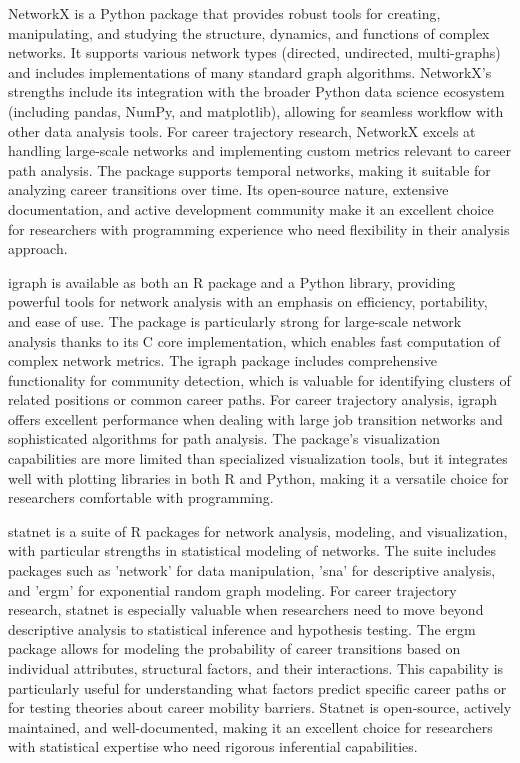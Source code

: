 \documentclass[../main.tex]{subfiles}
\begin{document}
NetworkX is a Python package that provides robust tools for creating, manipulating, and studying the structure, dynamics, and functions of complex networks. It supports various network types (directed, undirected, multi-graphs) and includes implementations of many standard graph algorithms. NetworkX's strengths include its integration with the broader Python data science ecosystem (including pandas, NumPy, and matplotlib), allowing for seamless workflow with other data analysis tools. For career trajectory research, NetworkX excels at handling large-scale networks and implementing custom metrics relevant to career path analysis. The package supports temporal networks, making it suitable for analyzing career transitions over time. Its open-source nature, extensive documentation, and active development community make it an excellent choice for researchers with programming experience who need flexibility in their analysis approach.


igraph is available as both an R package and a Python library, providing powerful tools for network analysis with an emphasis on efficiency, portability, and ease of use. The package is particularly strong for large-scale network analysis thanks to its C core implementation, which enables fast computation of complex network metrics. The igraph package includes comprehensive functionality for community detection, which is valuable for identifying clusters of related positions or common career paths. For career trajectory analysis, igraph offers excellent performance when dealing with large job transition networks and sophisticated algorithms for path analysis. The package's visualization capabilities are more limited than specialized visualization tools, but it integrates well with plotting libraries in both R and Python, making it a versatile choice for researchers comfortable with programming.


statnet is a suite of R packages for network analysis, modeling, and visualization, with particular strengths in statistical modeling of networks. The suite includes packages such as 'network' for data manipulation, 'sna' for descriptive analysis, and 'ergm' for exponential random graph modeling. For career trajectory research, statnet is especially valuable when researchers need to move beyond descriptive analysis to statistical inference and hypothesis testing. The ergm package allows for modeling the probability of career transitions based on individual attributes, structural factors, and their interactions. This capability is particularly useful for understanding what factors predict specific career paths or for testing theories about career mobility barriers. Statnet is open-source, actively maintained, and well-documented, making it an excellent choice for researchers with statistical expertise who need rigorous inferential capabilities.
\end{document}
